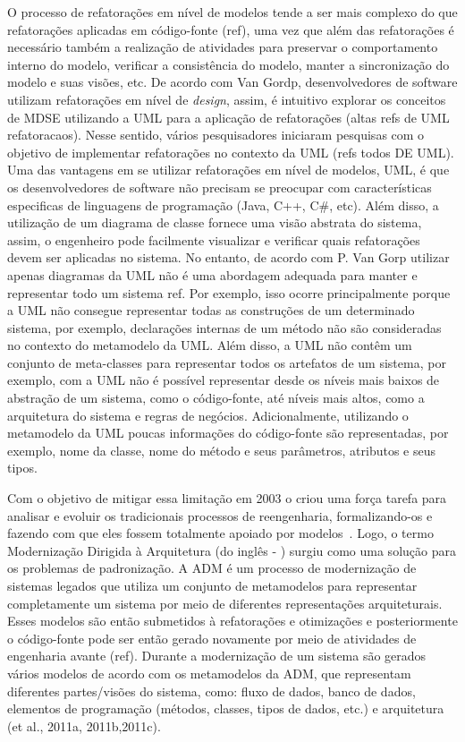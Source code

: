 O processo de refatorações em nível de modelos tende a ser mais complexo do que refatorações aplicadas em código-fonte (ref), uma vez que além das refatorações é necessário também a realização de atividades para preservar o comportamento interno do modelo, verificar a consistência do modelo, manter a sincronização do modelo e suas visões, etc. De acordo com Van Gordp, desenvolvedores de software utilizam refatorações em nível de \emph{design}, assim, é intuitivo explorar os conceitos de MDSE utilizando a UML para a aplicação de refatorações (altas refs de UML refatoracaos). Nesse sentido, vários pesquisadores iniciaram pesquisas com o objetivo de implementar refatorações no contexto da UML (refs todos DE UML). Uma das vantagens em se utilizar refatorações em nível de modelos, UML, é que os desenvolvedores de software não precisam se preocupar com características especificas de linguagens de programação (Java, C++, C\#, etc). Além disso, a utilização de um diagrama de classe fornece uma visão abstrata do sistema, assim, o engenheiro pode facilmente visualizar e verificar quais refatorações devem ser aplicadas no sistema. No entanto, de acordo com P. Van Gorp utilizar apenas diagramas da UML não é uma abordagem adequada para manter e representar todo um sistema {ref}. Por exemplo, isso ocorre principalmente porque a UML não consegue representar todas as construções de um determinado sistema, por exemplo, declarações internas de um método não são consideradas no contexto do metamodelo da UML. Além disso, a UML não contêm um conjunto de meta-classes para representar todos os artefatos de um sistema, por exemplo, com a UML não é possível representar desde os níveis mais baixos de abstração de um sistema, como o código-fonte, até níveis mais altos, como a arquitetura do sistema e regras de negócios. Adicionalmente, utilizando o metamodelo da UML poucas informações do código-fonte são representadas, por exemplo, nome da classe, nome do método e seus parâmetros, atributos e seus tipos.  

Com o objetivo de mitigar essa limitação em 2003 o  criou uma força tarefa para analisar e evoluir os tradicionais processos de reengenharia, formalizando-os e fazendo com que eles fossem totalmente apoiado por modelos~\cite{ADM:OMG}. Logo, o termo Modernização Dirigida à Arquitetura (do inglês - ) surgiu como uma solução para os problemas de padronização. A ADM é um processo de modernização de sistemas legados que utiliza um conjunto de metamodelos para representar completamente um sistema por meio de diferentes representações arquiteturais. Esses modelos são então submetidos à refatorações e otimizações e posteriormente o código-fonte pode ser então gerado novamente por meio de atividades de engenharia avante (ref). Durante a modernização de um sistema são gerados vários modelos de acordo com os metamodelos da ADM, que representam diferentes partes/visões do sistema, como: fluxo de dados, banco de dados, elementos de programação (métodos, classes, tipos de dados, etc.) e arquitetura (et al., 2011a, 2011b,2011c).


